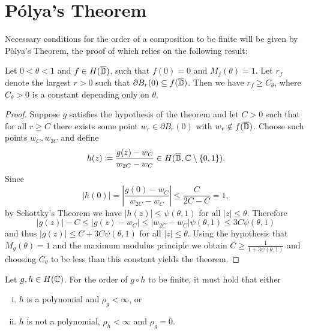 \section{Pólya's Theorem}
\label{sec:polyas-theorem}

Necessary conditions for the order of a composition to be finite will be given by Pòlya's Theorem, the proof of which relies on the following result:

\begin{theorem}[Bohr] \label{thm:bohr}
    Let $0 < \theta < 1$ and $f \in H(\overline{\mathbb{D}})$, such that $f(0) = 0$ and $M_f(\theta) = 1$. Let $r_f$ denote the largest $r > 0$ such that $\partial B_r(0) \subseteq f(\overline{\mathbb{D}})$. Then we have $r_f \geq C_\theta$, where $C_\theta > 0$ is a constant depending only on $\theta$.
\end{theorem}

\begin{proof}
    Suppose $g$ satisfies the hypothesis of the theorem and let $C > 0$ such that for all $r \geq C$ there exists some point $w_r \in \partial B_r(0)$ with $w_r \notin f(\overline{\mathbb{D}})$. Choose such points $w_C, w_{2C}$ and define
    $$ h(z) \coloneqq \frac{g(z) - w_C}{w_{2C} - w_C} \in H(\overline{\mathbb{D}}, \mathbb{C} \setminus \{ 0, 1 \}). $$
    Since
    $$ \vert h(0) \vert = \left\vert \frac{g(0) - w_C}{w_{2C} - w_C} \right\vert \leq \frac{C}{2C - C} = 1, $$
    by Schottky's Theorem we have $\vert h(z) \vert \leq \psi(\theta, 1)$ for all $\vert z \vert \leq \theta$. Therefore
    $$ \vert g(z) \vert - C \leq \vert g(z) - w_C \vert \leq \vert w_{2C} - w_C \vert \psi(\theta, 1) \leq 3 C \psi(\theta, 1) $$
    and thus $\vert g(z) \vert \leq C + 3C \psi(\theta, 1)$ for all $\vert z \vert \leq \theta$. Using the hypothesis that $M_g(\theta) = 1$ and the maximum modulus principle we obtain $C \geq \frac{1}{1 + 3 \psi(\theta, 1)}$ and choosing $C_\theta$ to be less than this constant yields the theorem.
\end{proof}

\begin{theorem}[Pólya] \label{thm:polya}
    Let $g, h \in H(\mathbb{C})$. For the order of $g \circ h$ to be finite, it must hold that either
    \begin{enumerate}[i.]
        \item $h$ is a polynomial and $\rho_g < \infty$, or
        \item $h$ is not a polynomial, $\rho_h < \infty$ and $\rho_g = 0$.
    \end{enumerate}
\end{theorem}

